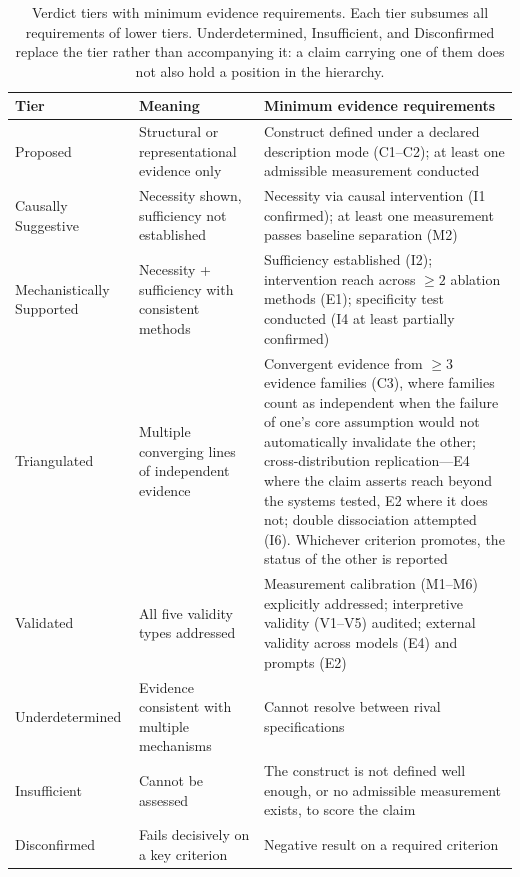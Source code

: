 \documentclass{article}
\begin{document}
\begin{table}[H]
\centering
\small
\caption{Verdict tiers with minimum evidence requirements. Each tier subsumes all requirements of lower tiers. Underdetermined, Insufficient, and Disconfirmed replace the tier rather than accompanying it: a claim carrying one of them does not also hold a position in the hierarchy.}
\label{tab:verdicts}
\label{tab:tier-promotion}
\renewcommand{\arraystretch}{1.15}
\begin{tabular}{@{}>{\raggedright\arraybackslash}p{2.2cm}>{\raggedright\arraybackslash}p{3.4cm}>{\raggedright\arraybackslash}p{7.0cm}@{}}
\toprule
\textbf{Tier} & \textbf{Meaning} & \textbf{Minimum evidence requirements} \\
\midrule
Proposed & Structural or representational evidence only & Construct defined under a declared description mode (C1--C2); at least one admissible measurement conducted \\
\midrule
Causally Suggestive & Necessity shown, sufficiency not established & Necessity via causal intervention (I1 confirmed); at least one measurement passes baseline separation (M2) \\
\midrule
Mechanistically Supported & Necessity + sufficiency with consistent methods & Sufficiency established (I2); intervention reach across $\geq 2$ ablation methods (E1); specificity test conducted (I4 at least partially confirmed) \\
\midrule
Triangulated & Multiple converging lines of independent evidence & Convergent evidence from $\geq 3$ evidence families (C3), where families count as independent when the failure of one's core assumption would not automatically invalidate the other; cross-distribution replication---E4 where the claim asserts reach beyond the systems tested, E2 where it does not; double dissociation attempted (I6). Whichever criterion promotes, the status of the other is reported \\
\midrule
Validated & All five validity types addressed & Measurement calibration (M1--M6) explicitly addressed; interpretive validity (V1--V5) audited; external validity across models (E4) and prompts (E2) \\
\midrule
Underdetermined & Evidence consistent with multiple mechanisms & Cannot resolve between rival specifications \\
\midrule
Insufficient & Cannot be assessed & The construct is not defined well enough, or no admissible measurement exists, to score the claim \\
\midrule
Disconfirmed & Fails decisively on a key criterion & Negative result on a required criterion \\
\bottomrule
\end{tabular}
\end{table}
\end{document}
